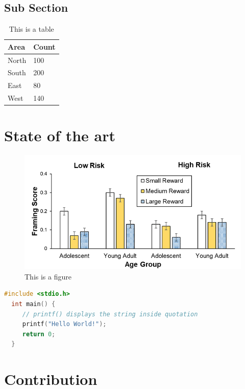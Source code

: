 \documentclass{silreport}
\begin{document}
\section{Sub Section}
\lipsum[1]

\begin{table}[hbt]
\centering
\begin{tabular}{ll}
\hline
Area & Count\\
\hline
North & 100\\
South & 200\\
East & 80\\
West & 140\\
\hline
\end{tabular}
\caption{This is a table}
\label{tab:sample}
\end{table}
\lipsum[1-2]

\chapter{State of the art}
\lipsum[1-2]

\begin{figure}[htp]
\centering
\includegraphics[width=.5\textwidth]{figures/sample_figure.jpg}
\caption{This is a figure}
\label{fig:samplefigure}
\end{figure}

\lipsum[1-2]

\begin{lstlisting}[language=C, caption=Sample C Program, captionpos=b]
  #include <stdio.h>
  int main() {
     // printf() displays the string inside quotation
     printf("Hello World!");
     return 0;
  }
\end{lstlisting}

\lipsum[1-2]



\chapter{Contribution}
\lipsum[1-2]
\end{document}
